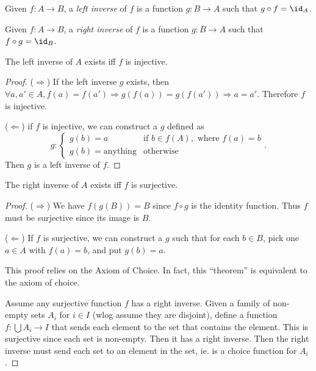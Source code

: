\documentclass[a4paper]{article}
\begin{document}
  \begin{defi}
    Given $f: A\to B$, a \emph{left inverse} of $f$ is a function $g:B\to A$ such that $g\circ f = \id _A$.
  \end{defi}

  \begin{defi}
    Given $f: A\to B$, a \emph{right inverse} of $f$ is a function $g:B\to A$ such that $f\circ g = \id _B$.
  \end{defi}

  \begin{thm}
    The left inverse of $A$ exists iff $f$ is injective.
  \end{thm}

  \begin{proof}
    ($\Rightarrow$)
    If the left inverse $g$ exists, then $\forall a, a'\in A, f(a) = f(a') \Rightarrow g(  f(a))=g(f(a'))\Rightarrow a=a'$. Therefore $f$ is injective.

    ($\Leftarrow$) if $f$ is injective, we can construct a $g$ defined as
    \[
      g: \begin{cases}
        g(b) = a &\text{if }b\in f(A), \text{ where }f(a) = b\\
        g(b) = \text{anything} & \text{otherwise}
      \end{cases}.
    \]
    Then $g$ is a left inverse of $f$.
  \end{proof}

  \begin{thm}
    The right inverse of $A$ exists iff $f$ is surjective.
  \end{thm}

  \begin{proof}
    ($\Rightarrow$) We have $f(g(B)) = B$ since $f\circ g$ is the identity function. Thus $f$ must be surjective since its image is $B$.

    ($\Leftarrow$) If $f$ is surjective, we can construct a $g$ such that for each $b\in B$, pick one $a\in A$ with $f(a) = b$, and put $g(b) = a$.

    \note This proof relies on the Axiom of Choice. In fact, this ``theorem'' is equivalent to the axiom of choice.

    Assume any surjective function $f$ has a right inverse. Given a family of non-empty sets $A_i$ for $i\in I$ (wlog assume they are disjoint), define a function $f: \bigcup A_i \to I$ that sends each element to the set that contains the element. This is surjective since each set is non-empty. Then it has a right inverse. Then the right inverse must send each set to an element in the set, ie. is a choice function for $A_i$.
  \end{proof}
\end{document}

